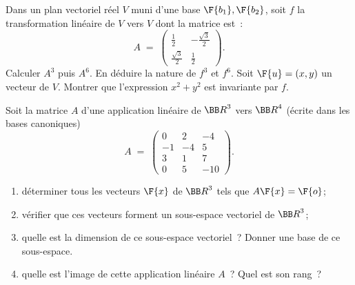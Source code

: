 \documentclass[12pt,french,oneside,a4paper]{memoir} %
\begin{document}
\begin{exo}
Dans un plan vectoriel réel $V$ muni d'une base $\F{b_1},\F{b_2}$, soit $f$ la transformation linéaire de $V$ vers $V$ dont la matrice est~:
\begin{equation*}
A\;=\; \left( \begin{array}{cc}
\displaystyle{
\frac{1}{2}} &\displaystyle{- \frac{\sqrt{3}}{2}} \\[4mm]
\displaystyle{\frac{\sqrt{3}}{2}} &\displaystyle{\frac{1}{2}}
\end{array} \right).
\end{equation*}
Calculer $A^3$ puis $A^6$. En déduire la nature de $f^3$ et $f^6$. Soit 
$\F{u}=(x,y)$ un vecteur de $V$. Montrer que l'expression $x^2+y^2$ est invariante
par $f$.
\end{exo}
\begin{exo}
Soit la matrice $A$ d'une application linéaire de ${\BB R}^3$ vers 
${\BB R}^4$ (écrite dans les bases canoniques)
\begin{equation*}
A\;=\; \left( \begin{array}{rrr}
0 &2 &-4 \\
-1 &-4 &5 \\
3 &1 &7 \\
0 &5 &-10
\end{array} \right).
\end{equation*}
\begin{enumerate}
\item déterminer tous les vecteurs $\F{x}$ de ${\BB R}^3$ tels que 
$A \F{x} = \F{o}$; 
\item vérifier que ces vecteurs forment un sous-espace vectoriel de 
${\BB R}^3$; 
\item quelle est la dimension de ce sous-espace vectoriel~? Donner une 
base de ce sous-espace.
\item quelle est l'image de cette application linéaire $A$~? Quel est son rang~?
\end{enumerate}
\end{exo}
\end{document}
